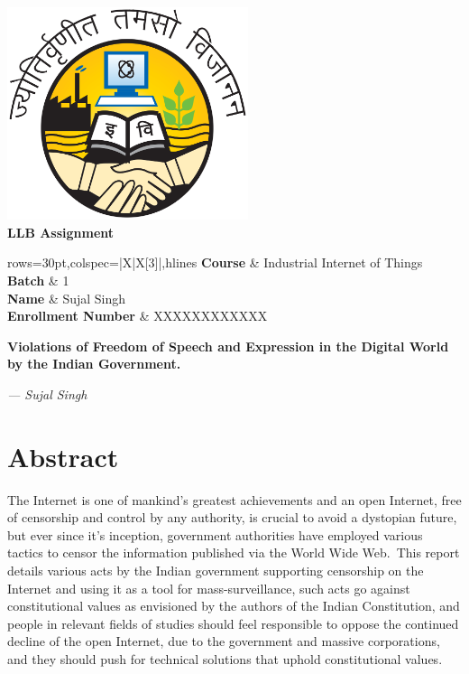 \documentclass[11pt,a4paper,oneside]{scrarticle}
\renewcommand*{\maketitle}{
    \pagenumbering{gobble}
    \begin{center}
        \vspace*{8em}
        \includegraphics[width=200pt]{../../tools/pdf/template/logo} \\[40pt]
        \textbf{\Huge LLB Assignment} \\[40pt]
        \begin{table}[htb]
            \label{tab:name-slip}
            \begin{tblr}{rows={30pt},colspec={|X|X[3]|},hlines}
                \textbf{Course}            & Industrial Internet of Things \\
                \textbf{Batch}             & 1                             \\
                \textbf{Name}              & Sujal Singh                   \\
                \textbf{Enrollment Number} & XXXXXXXXXXXX                  \\
            \end{tblr}
        \end{table}
    \end{center}
    \newpage
    \pagenumbering{arabic}
}
\begin{document}
    \maketitle

    \begin{center}
        \textbf{\LARGE Violations of Freedom of Speech and Expression in the Digital World by the Indian Government.}
        \\[10pt]
    \end{center}
    \begin{flushright}
        \textit{--- Sujal Singh} \\[20pt]
    \end{flushright}


    \section*{Abstract}\label{sec:abstract}
    The Internet is one of mankind's greatest achievements and an open Internet, free of censorship and control by any
    authority, is crucial to avoid a dystopian future, but ever since it's inception, government authorities have
    employed various tactics to censor the information published via the World Wide Web.\ This report details various
    acts by the Indian government supporting censorship on the Internet and using it as a tool for mass-surveillance,
    such acts go against constitutional values as envisioned by the authors of the Indian Constitution, and people in
    relevant fields of studies should feel responsible to oppose the continued decline of the open Internet, due to the
    government and massive corporations, and they should push for technical solutions that uphold constitutional values.
\end{document}
